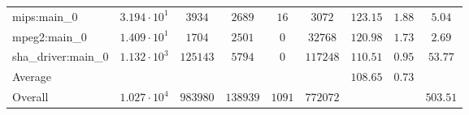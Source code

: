 \begin{tabular}{|l|c|c|c|c|c|c|c|c|}
mips:main\_0            & $ 3.194 \cdot 10^{1} $ & $ 3934   $ & $ 2689   $ & $ 16   $ & $ 3072   $ & $ 123.15      $ & $ 1.88    $ & $ 5.04    $ \\
mpeg2:main\_0           & $ 1.409 \cdot 10^{1} $ & $ 1704   $ & $ 2501   $ & $ 0    $ & $ 32768  $ & $ 120.98      $ & $ 1.73    $ & $ 2.69    $ \\
sha\_driver:main\_0     & $ 1.132 \cdot 10^{3} $ & $ 125143 $ & $ 5794   $ & $ 0    $ & $ 117248 $ & $ 110.51      $ & $ 0.95    $ & $ 53.77   $ \\
\hline
Average                 & $                    $ & $        $ & $        $ & $      $ & $        $ & $ 108.65      $ & $ 0.73    $ & $         $ \\
\hline
Overall                 & $ 1.027 \cdot 10^{4} $ & $ 983980 $ & $ 138939 $ & $ 1091 $ & $ 772072 $ & $             $ & $         $ & $ 503.51  $ \\
\hline
\end{tabular}
